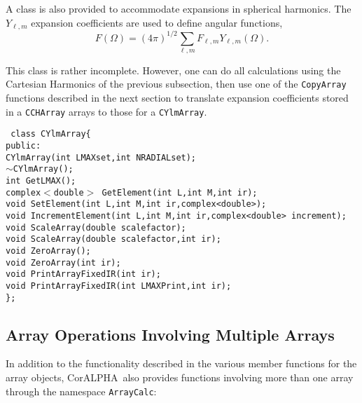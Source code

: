 \documentclass[10pt]{article}
\def\tab{\hspace*{9pt}}
\newcommand{\projectname}{CorALPHA}
\begin{document}
A class is also provided to accommodate expansions in spherical harmonics. The $Y_{\ell,m}$ expansion coefficients are used to define angular functions,
\begin{equation}
F(\Omega)=(4\pi)^{1/2}\sum_{\ell,m}F_{\ell,m}Y_{\ell,m}(\Omega).
\end{equation}

This class is rather incomplete. However, one can do all calculations using the Cartesian Harmonics of the previous subsection, then use one of the {\tt CopyArray} functions described in the next section to translate expansion coefficients stored in a {\tt CCHArray} arrays to those for a {\tt CYlmArray}.

{\tt
class CYlmArray\{\\
\tab public:\\
\tab \tab  CYlmArray(int LMAXset,int NRADIALset);\\
\tab \tab  $\sim$CYlmArray();\\
\tab \tab  int GetLMAX();\\
\tab \tab  complex$<$double$>$ GetElement(int L,int M,int ir);\\
\tab \tab  void SetElement(int L,int M,int ir,complex<double>);\\
\tab \tab  void IncrementElement(int L,int M,int ir,complex<double> increment);\\
\tab \tab  void ScaleArray(double scalefactor);\\
\tab \tab  void ScaleArray(double scalefactor,int ir);\\
\tab \tab  void ZeroArray();\\
\tab \tab  void ZeroArray(int ir);\\
\tab \tab  void PrintArrayFixedIR(int ir);\\
\tab \tab  void PrintArrayFixedIR(int LMAXPrint,int ir);\\
\};\\ }

\subsection{Array Operations Involving Multiple Arrays}

In addition to the functionality described in the various member functions for the array objects, \projectname\ also provides functions involving more than one array through the namespace {\tt ArrayCalc}:
\end{document}

